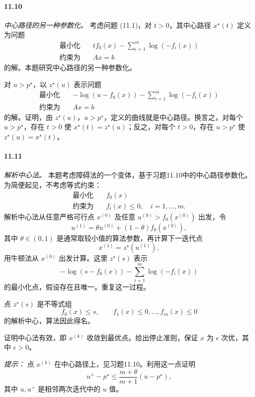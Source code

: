 \paragraph{11.10} \emph{中心路径的另一种参数化。} 考虑问题 (11.1)，对 $t>0$，其中心路径 $x^\star(t)$ 定义为问题
\[
\begin{aligned}\text{最小化}\quad&tf_0(x)-\sum_{i=1}^m\log(-f_i(x))\\\text{约束为}\quad&Ax=b\end{aligned}
\]
的解。本题研究中心路径的另一种参数化。

对 $u>p^\star$，以 $z^\star(u)$ 表示问题
\[
\begin{aligned}\text{最小化}\quad&-\log(u-f_0(x))-\sum_{i=1}^m\log(-f_i(x))\\\text{约束为}\quad&Ax=b\end{aligned}
\]
的解。证明，由 $z^\star(u)$，$u>p^\star$，定义的曲线就是中心路径。换言之，对每个 $u>p^\star$，存在 $t>0$ 使 $x^\star(t)=z^\star(u)$；反之，对每个 $t>0$，存在 $u>p^\star$ 使 $z^\star(u)=x^\star(t)$。

\paragraph{11.11} \emph{解析中心法。} 本题考虑障碍法的一个变体，基于习题11.10中的中心路径参数化。为简便起见，不考虑等式约束：
\[
\begin{aligned}\text{最小化}\quad&f_0(x)\\\text{约束为}\quad&f_i(x)\le0,\quad i=1,\ldots,m.\end{aligned}
\]
解析中心法从任意严格可行点 $x^{(0)}$ 及任意 $u^{(0)}>f_0(x^{(0)})$ 出发，令
\[
u^{(1)}=\theta u^{(0)}+(1-\theta)f_0(x^{(0)}),
\]
其中 $\theta\in(0,1)$ 是通常取较小值的算法参数，再计算下一迭代点
\[
x^{(1)}=z^\star(u^{(1)}),
\]
用牛顿法从 $x^{(0)}$ 出发计算。这里 $z^\star(s)$ 表示
\[
-\log(s-f_0(x))-\sum_{i=1}^m\log(-f_i(x))
\]
的最小化点，假设存在且唯一。重复这一过程。

点 $z^\star(s)$ 是不等式组
\[
f_0(x)\le s,\qquad f_1(x)\le0,\ldots,f_m(x)\le0
\]
的解析中心，算法因此得名。

证明中心法有效，即 $x^{(k)}$ 收敛到最优点。给出停止准则，保证 $x$ 为 $\epsilon$ 次优，其中 $\epsilon>0$。

\emph{提示：} 点 $x^{(k)}$ 在中心路径上，见习题11.10。利用这一点证明
\[
u^+-p^\star\le\frac{m+\theta}{m+1}(u-p^\star),
\]
其中 $u,u^+$ 是相邻两次迭代中的 $u$ 值。

